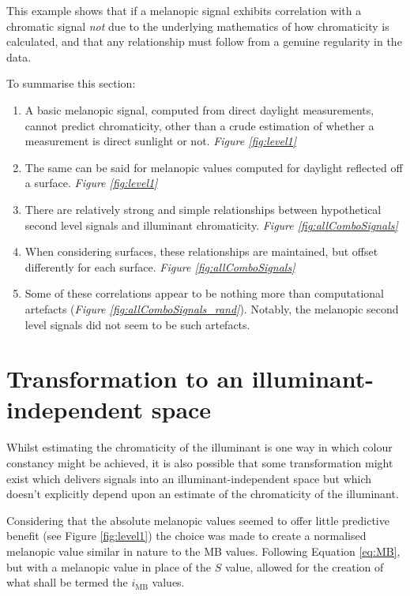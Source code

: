This example shows that if a melanopic signal exhibits correlation with a chromatic signal \emph{not} due to the underlying mathematics of how chromaticity is calculated, and that any relationship must follow from a genuine regularity in the data.

\bigskip
\noindent
To summarise this section:

\begin{enumerate}
   \item A basic melanopic signal, computed from direct daylight measurements, cannot predict chromaticity, other than a crude estimation of whether a measurement is direct sunlight or not. \emph{Figure \ref{fig:level1}}
    \item The same can be said for melanopic values computed for daylight reflected off a surface. \emph{Figure \ref{fig:level1}}
    \item There are relatively strong and simple relationships between hypothetical second level signals and illuminant chromaticity. \emph{Figure \ref{fig:allComboSignals}}
    \item When considering surfaces, these relationships are maintained, but offset differently for each surface. \emph{Figure \ref{fig:allComboSignals}}
    \item Some of these correlations appear to be nothing more than computational artefacts (\emph{Figure \ref{fig:allComboSignals_rand}}). Notably, the melanopic second level signals did not seem to be such artefacts.
\end{enumerate}

\clearpage


\section{Transformation to an illuminant-independent space}

Whilst estimating the chromaticity of the illuminant is one way in which colour constancy might be achieved, it is also possible that some transformation might exist which delivers signals into an illuminant-independent space but which doesn't explicitly depend upon an estimate of the chromaticity of the illuminant.

Considering that the absolute melanopic values seemed to offer little predictive benefit (see Figure \ref{fig:level1}) the choice was made to create a normalised melanopic value similar in nature to the MB values. Following Equation \ref{eq:MB}, but with a melanopic value in place of the $S$ value, allowed for the creation of what shall be termed the $i_{\text{MB}}$ values.

